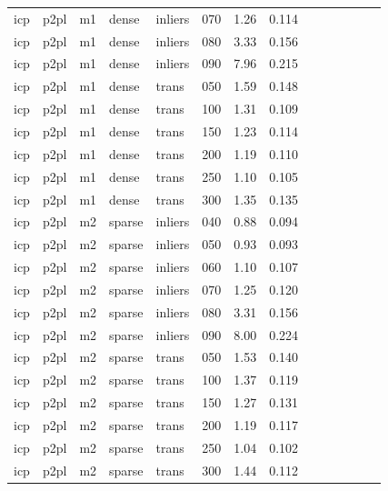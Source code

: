 \begin{table}[htbp]
\begin{tabular}{llllllrrrrrrrr}
  icp & p2pl & m1 & dense & inliers & 070 & 1.26 & 0.114 \\
  icp & p2pl & m1 & dense & inliers & 080 & 3.33 & 0.156 \\
  icp & p2pl & m1 & dense & inliers & 090 & 7.96 & 0.215 \\
  icp & p2pl & m1 & dense & trans & 050 & 1.59 & 0.148 \\
  icp & p2pl & m1 & dense & trans & 100 & 1.31 & 0.109 \\
  icp & p2pl & m1 & dense & trans & 150 & 1.23 & 0.114 \\
  icp & p2pl & m1 & dense & trans & 200 & 1.19 & 0.110 \\
  icp & p2pl & m1 & dense & trans & 250 & 1.10 & 0.105 \\
  icp & p2pl & m1 & dense & trans & 300 & 1.35 & 0.135 \\
  icp & p2pl & m2 & sparse & inliers & 040 & 0.88 & 0.094 \\
  icp & p2pl & m2 & sparse & inliers & 050 & 0.93 & 0.093 \\
  icp & p2pl & m2 & sparse & inliers & 060 & 1.10 & 0.107 \\
  icp & p2pl & m2 & sparse & inliers & 070 & 1.25 & 0.120 \\
  icp & p2pl & m2 & sparse & inliers & 080 & 3.31 & 0.156 \\
  icp & p2pl & m2 & sparse & inliers & 090 & 8.00 & 0.224 \\
  icp & p2pl & m2 & sparse & trans & 050 & 1.53 & 0.140 \\
  icp & p2pl & m2 & sparse & trans & 100 & 1.37 & 0.119 \\
  icp & p2pl & m2 & sparse & trans & 150 & 1.27 & 0.131 \\
  icp & p2pl & m2 & sparse & trans & 200 & 1.19 & 0.117 \\
  icp & p2pl & m2 & sparse & trans & 250 & 1.04 & 0.102 \\
  icp & p2pl & m2 & sparse & trans & 300 & 1.44 & 0.112 \\
\bottomrule
\end{tabular}
\end{table}

